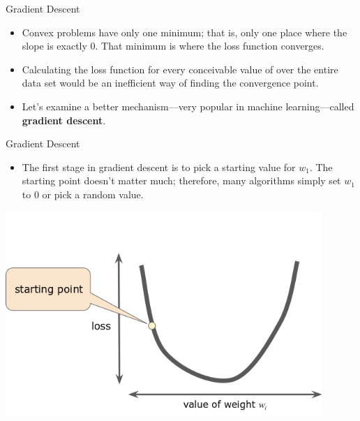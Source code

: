 \documentclass{beamer}
\begin{document}
\begin{frame}{Gradient Descent}
\begin{itemize}
    \item Convex problems have only one minimum; that is, only one place where the slope is exactly $0$. That minimum is where the loss function converges.
    
    \item Calculating the loss function for every conceivable value of  over the entire data set would be an inefficient way of finding the convergence point. 
    
    \item Let's examine a better mechanism—very popular in machine learning—called {\bf gradient descent}.
\end{itemize}
\end{frame}

\begin{frame}{Gradient Descent}
\begin{itemize}
    \item The first stage in gradient descent is to pick a starting value for $w_1$. The starting point doesn't matter much; therefore, many algorithms simply set $w_1$ to $0$ or pick a random value. 
\end{itemize}
\includegraphics[width=0.9\textwidth]{images/GradientDescentStartingPoint.png}
\end{frame}
\end{document}
